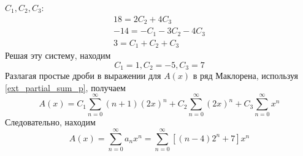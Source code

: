 \begin{task}
\begin{solution}
        $C_1, C_2, C_3$:
        \begin{gather*}
            18 = 2C_2 + 4C_3 \\
            -14 = -C_1 - 3C_2 - 4C_3 \\
            3 = C_1 + C_2 + C_3
        \end{gather*}
        Решая эту систему, находим
        \begin{equation*}
            C_1 = 1, C_2 = -5, C_3 = 7
        \end{equation*}
        Разлагая простые дроби в выражении для $A(x)$ в ряд Маклорена, используя \ref{ext_partial_sum_p},
        получаем
        \begin{equation*}
            A(x) = C_1 \sum_{n = 0}^{\infty} (n+1)(2x)^n + C_2 \sum_{n = 0}^{\infty} (2x)^n + C_3 \sum_{n = 0}^{\infty} x^n
        \end{equation*}
        Следовательно, находим
        \begin{equation*}
            A(x) = \sum_{n = 0}^{\infty} a_n x^n = \sum_{n = 0}^{\infty}\left[(n - 4) 2^n + 7\right] x^n
        \end{equation*}
    \end{solution}
\end{task}